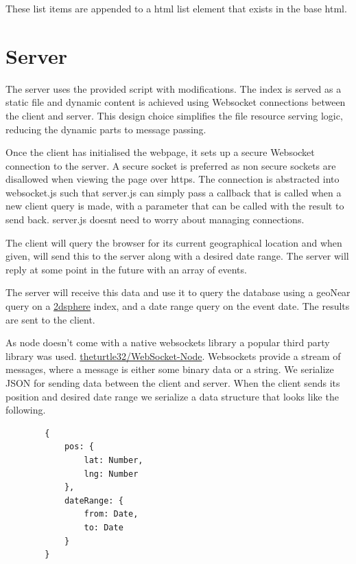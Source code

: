 \documentclass[10pt]{article}
\begin{document}
            These list items are appended to a html list element that exists in the base html.

    \section{Server}
        The server uses the provided script with modifications. The index is served as a static file and dynamic content is achieved using Websocket connections between the client and server. This design choice simplifies the file resource serving logic, reducing the dynamic parts to message passing.

        Once the client has initialised the webpage, it sets up a secure Websocket connection to the server. A secure socket is preferred as non secure sockets are disallowed when viewing the page over https. The connection is abstracted into websocket.js such that server.js can simply pass a callback that is called when a new client query is made, with a parameter that can be called with the result to send back. server.js doesnt need to worry about managing connections.

        The client will query the browser for its current geographical location and when given, will send this to the server along with a desired date range. The server will reply at some point in the future with an array of events.

        The server will receive this data and use it to query the database using a geoNear query on a \href{https://docs.mongodb.com/manual/core/2dsphere/}{2dsphere} index, and a date range query on the event date. The results are sent to the client.

        As node doesn't come with a native websockets library a popular third party library was used. \href{https://github.com/theturtle32/WebSocket-Node}{theturtle32/WebSocket-Node}. Websockets provide a stream of messages, where a message is either some binary data or a string. We serialize JSON for sending data between the client and server. When the client sends its position and desired date range we serialize a data structure that looks like the following.

        \begin{verbatim}
        {
            pos: {
                lat: Number,
                lng: Number
            },
            dateRange: {
                from: Date,
                to: Date
            }
        }
        \end{verbatim}
\end{document}

